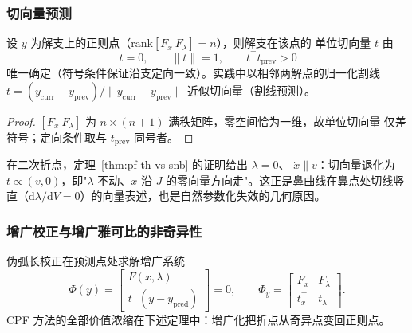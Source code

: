 \subsubsection{切向量预测}
\begin{proposition}[切向量的确定]\label{prop:pf-th-vs-tangent}
设 $y$ 为解支上的正则点（$\mathrm{rank}[F_x\ F_\lambda]=n$），则解支在该点的
单位切向量 $t$ 由
\begin{equation}
[F_x\ \ F_\lambda]\,t=0,\qquad \|t\|=1,\qquad t^{\top}t_{\mathrm{prev}}>0
\end{equation}
唯一确定（符号条件保证沿支定向一致）。实践中以相邻两解点的归一化割线
$t=(y_{\mathrm{curr}}-y_{\mathrm{prev}})/\|y_{\mathrm{curr}}-y_{\mathrm{prev}}\|$
近似切向量（割线预测）。
\end{proposition}
\begin{proof}
$[F_x\ F_\lambda]$ 为 $n\times(n+1)$ 满秩矩阵，零空间恰为一维，故单位切向量
仅差符号；定向条件取与 $t_{\mathrm{prev}}$ 同号者。
\end{proof}

\begin{remark}[折点处切向量的形态]
在二次折点，定理~\ref{thm:pf-th-vs-snb} 的证明给出 $\dot\lambda=0$、
$\dot x\parallel v$：切向量退化为 $t\propto(v,0)$，即"$\lambda$ 不动、$x$ 沿
$J$ 的零向量方向走"。这正是鼻曲线在鼻点处切线竖直（$\mathrm{d}\lambda/
\mathrm{d}V=0$）的向量表述，也是自然参数化失效的几何原因。
\end{remark}

\subsubsection{增广校正与增广雅可比的非奇异性}
伪弧长校正在预测点处求解增广系统
\begin{equation}
\Phi(y)=
\begin{bmatrix}
F(x,\lambda)\\[2pt] t^{\top}(y-y_{\mathrm{pred}})
\end{bmatrix}=0,
\qquad
\Phi_y=\begin{bmatrix}F_x & F_\lambda\\ t_x^{\top} & t_\lambda\end{bmatrix}.
\end{equation}
CPF 方法的全部价值浓缩在下述定理中：增广化把折点从奇异点变回正则点。


